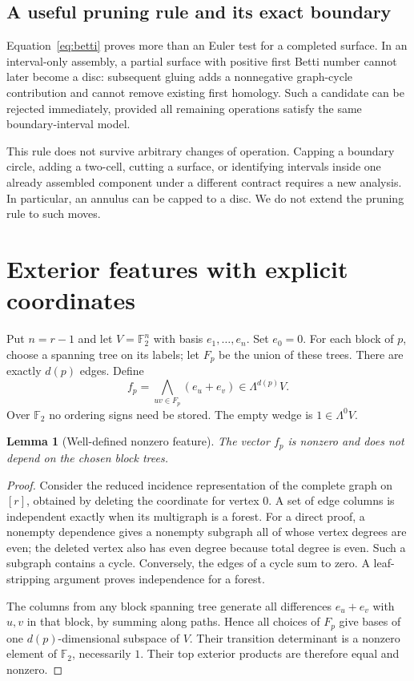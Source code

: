 \documentclass[11pt,a4paper]{article}
\newtheorem{lemma}[theorem]{Lemma}
\theoremstyle{remark}\newtheorem{remark}[theorem]{Remark}
\newcommand{\F}{\mathbb F_2}
\begin{document}
\subsection{A useful pruning rule and its exact boundary}
Equation~\eqref{eq:betti} proves more than an Euler test for a completed surface. In an interval-only assembly, a partial surface with positive first Betti number cannot later become a disc: subsequent gluing adds a nonnegative graph-cycle contribution and cannot remove existing first homology. Such a candidate can be rejected immediately, provided all remaining operations satisfy the same boundary-interval model.

This rule does not survive arbitrary changes of operation. Capping a boundary circle, adding a two-cell, cutting a surface, or identifying intervals inside one already assembled component under a different contract requires a new analysis. In particular, an annulus can be capped to a disc. We do not extend the pruning rule to such moves.

\section{Exterior features with explicit coordinates}\label{sec:features}
Put $n=r-1$ and let $V=\F^n$ with basis $e_1,\ldots,e_n$. Set $e_0=0$. For each block of $p$, choose a spanning tree on its labels; let $F_p$ be the union of these trees. There are exactly $d(p)$ edges. Define
\begin{equation}\label{eq:feature}
 f_p=\bigwedge_{uv\in F_p}(e_u+e_v)\in\Lambda^{d(p)}V.
\end{equation}
Over $\F$ no ordering signs need be stored. The empty wedge is $1\in\Lambda^0V$.

\begin{lemma}[Well-defined nonzero feature]\label{lem:well-defined}
The vector $f_p$ is nonzero and does not depend on the chosen block trees.
\end{lemma}
\begin{proof}
Consider the reduced incidence representation of the complete graph on $[r]$, obtained by deleting the coordinate for vertex $0$. A set of edge columns is independent exactly when its multigraph is a forest. For a direct proof, a nonempty dependence gives a nonempty subgraph all of whose vertex degrees are even; the deleted vertex also has even degree because total degree is even. Such a subgraph contains a cycle. Conversely, the edges of a cycle sum to zero. A leaf-stripping argument proves independence for a forest.

The columns from any block spanning tree generate all differences $e_u+e_v$ with $u,v$ in that block, by summing along paths. Hence all choices of $F_p$ give bases of one $d(p)$-dimensional subspace of $V$. Their transition determinant is a nonzero element of $\F$, necessarily $1$. Their top exterior products are therefore equal and nonzero.
\end{proof}
\end{document}
